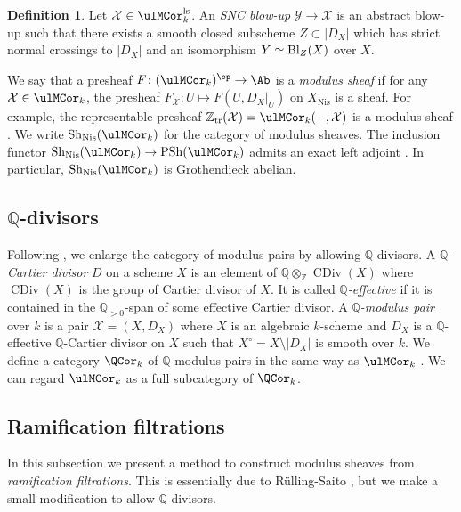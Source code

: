 \documentclass{amsart}
\theoremstyle{plain}
\theoremstyle{definition}
\newtheorem{definition}[theorem]{Definition}
\theoremstyle{remark}
\numberwithin{equation}{section}
\DeclareMathOperator{\Sh}{Sh}
\DeclareMathOperator{\CDiv}{CDiv}
\def\tr{\mathrm{tr}}
\def\Nis{\mathrm{Nis}}
\def\ls{\mathrm{ls}}
\begin{document}
\begin{definition}\label{def:SNC_blowup}
	Let $\mathcal{X}\in \ulMCor_k^\ls$.
	An \emph{SNC blow-up} $\mathcal{Y}\to \mathcal{X}$ is an abstract blow-up such that there exists a smooth closed subscheme $Z\subset |D_X|$ which has strict normal crossings to $|D_X|$ and an isomorphism $Y\simeq \operatorname{Bl}_Z(X)$ over $X$.
\end{definition}


We say that a presheaf $F\colon (\ulMCor_k)^\op\to \Ab$ is a \emph{modulus sheaf} if for any $\mathcal{X}\in \ulMCor_k$, the presheaf $F_\mathcal{X}\colon U\mapsto F(U,D_X|_U)$ on $X_\Nis$ is a sheaf.
For example, the representable presheaf $\mathbb{Z}_\tr(\mathcal{X})=\ulMCor_k({-},\mathcal{X})$ is a modulus sheaf \cite[Proposition 3.3.5]{KMSY1}.
We write $\Sh_\Nis(\ulMCor_k)$ for the category of modulus sheaves.
The inclusion functor $\Sh_\Nis(\ulMCor_k)\to \PSh(\ulMCor_k)$ admits an exact left adjoint \cite[Theorem 4.5.5]{KMSY1}.
In particular, $\Sh_\Nis(\ulMCor_k)$ is Grothendieck abelian.




\subsection{$\mathbb{Q}$-divisors}

Following \cite{Koizumi-Miyazaki}, we enlarge the category of modulus pairs by allowing $\mathbb{Q}$-divisors.
A \emph{$\mathbb{Q}$-Cartier divisor} $D$ on a scheme $X$ is an element of $\mathbb{Q}\otimes_\mathbb{Z}\CDiv(X)$ where $\CDiv(X)$ is the group of Cartier divisor of $X$.
It is called \emph{$\mathbb{Q}$-effective} if it is contained in the $\mathbb{Q}_{>0}$-span of some effective Cartier divisor. 
A \emph{$\mathbb{Q}$-modulus pair} over $k$ is a pair $\mathcal{X}=(X,D_X)$ where $X$ is an algebraic $k$-scheme and $D_X$ is a $\mathbb{Q}$-effective $\mathbb{Q}$-Cartier divisor on $X$ such that $X^\circ=X\setminus|D_X|$ is smooth over $k$.
We define a category $\QCor_k$ of $\mathbb{Q}$-modulus pairs in the same way as $\ulMCor_k$ \cite[Definition 2.9]{Koizumi-Miyazaki}.
We can regard $\ulMCor_k$ as a full subcategory of $\QCor_k$.





\subsection{Ramification filtrations}
In this subsection we present a method to construct modulus sheaves from \emph{ramification filtrations}.
This is essentially due to R\"ulling-Saito \cite{RS21}, but we make a small modification to allow $\mathbb{Q}$-divisors.
\end{document}
